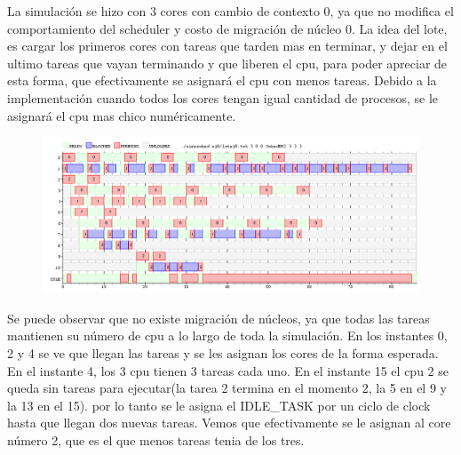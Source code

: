 La simulación se hizo con 3 cores con cambio de contexto 0, ya que no modifica el comportamiento del scheduler y costo de migración de núcleo 0.
La idea del lote, es cargar los primeros cores con tareas que tarden mas en terminar, y dejar en el ultimo tareas que vayan terminando y que liberen el cpu, 
para poder apreciar de esta forma, que efectivamente se asignará el cpu con menos tareas.
Debido a la implementación cuando todos los cores tengan igual cantidad de procesos, se le asignará el cpu mas chico numéricamente. 

\newpage

\begin{figure}[h]
  \includegraphics[width=\textwidth]{../ej8/rr2.png}
  \caption{}
\end{figure}

Se puede observar que no existe migración de núcleos, ya que todas las tareas mantienen su número de cpu a lo largo de toda la simulación.
En los instantes 0, 2 y 4 se ve que llegan las tareas y se les asignan los cores de la forma esperada. En el instante 4, los 3 cpu tienen
3 tareas cada uno. En el instante 15 el cpu 2 se queda sin tareas para ejecutar(la tarea 2 termina en el momento 2, la 5 en el 9 y la 13 en el 15). por lo tanto se le asigna el IDLE_TASK por un ciclo de clock
hasta que llegan dos nuevas tareas. Vemos que efectivamente se le asignan al core número 2, que es el que menos tareas tenia de los tres. 









